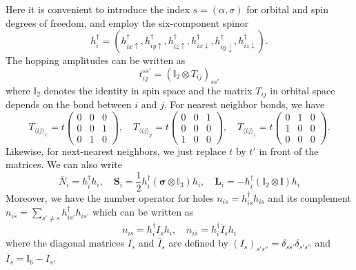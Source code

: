 \documentclass[11pt, a4paper]{article}
\begin{document}
Here it is convenient to introduce the index $s = (\alpha, \sigma)$ for orbital and spin degrees of freedom, and employ the six-component spinor
\begin{equation}
h_i^{\dagger} = (h_{ix\uparrow}^{\dagger}, h_{iy\uparrow}^{\dagger}, h_{iz\uparrow}^{\dagger}, h_{ix\downarrow}^{\dagger}, h_{iy\downarrow}^{\dagger}, h_{iz\downarrow}^{\dagger}).
\end{equation}
The hopping amplitudes can be written as
\begin{equation}
t_{ij}^{ss'} = (\mathbb{I}_2 \otimes T_{ij})_{ss'}
\end{equation}
where $\mathbb{I}_2$ denotes the identity in spin space and the matrix $T_{ij}$ in orbital space depends on the bond between $i$ and $j$. For nearest neighbor bonds, we have
\begin{equation}
T_{\langle ij \rangle_x} = t \begin{pmatrix} 0 & 0 & 0 \\ 0 & 0 & 1 \\ 0 & 1 & 0 \end{pmatrix}, \quad
T_{\langle ij \rangle_y} = t \begin{pmatrix} 0 & 0 & 1 \\ 0 & 0 & 0 \\ 1 & 0 & 0 \end{pmatrix}, \quad
T_{\langle ij \rangle_z} = t \begin{pmatrix} 0 & 1 & 0 \\ 1 & 0 & 0 \\ 0 & 0 & 0 \end{pmatrix}.
\end{equation}
Likewise, for next-nearest neighbors, we just replace $t$ by $t'$ in front of the matrices. We can also write
\begin{equation}
\overline{N}_i = h_i^{\dagger} h_i, \quad \bm{S}_i = \frac{1}{2} h_i^{\dagger} (\bm{\sigma} \otimes \mathbb{I}_3) h_i, \quad \bm{L}_i = -h_i^{\dagger} (\mathbb{I}_2 \otimes \bm{l}) h_i
\end{equation}
Moreover, we have the number operator for holes $n_{is} = h_{is}^{\dagger} h_{is}$ and its complement $n_{i\overline{s}} = \sum_{s' \neq s} h_{is'}^{\dagger} h_{is'}$ which can be written as
\begin{equation}
n_{is} = h_i^{\dagger} I_s h_i, \quad n_{i\overline{s}} = h_i^{\dagger} \overline{I}_s h_i
\end{equation}
where the diagonal matrices $I_s$ and $\overline{I}_s$ are defined by $(I_s)_{s's''} = \delta_{ss'} \delta_{s's''}$ and $\overline{I}_s = \mathbb{I}_6 - I_s$.
\end{document}
